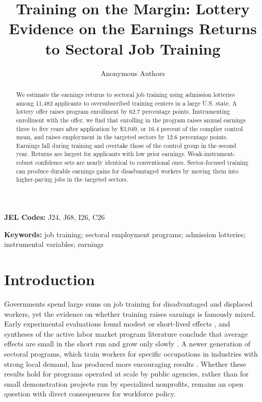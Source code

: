 \documentclass[12pt]{article}
\title{Training on the Margin: Lottery Evidence on the Earnings Returns to Sectoral Job Training}
\author{Anonymous Authors}
\date{}
\begin{document}
\maketitle

\begin{abstract}
We estimate the earnings returns to sectoral job training using admission lotteries among 11,482 applicants to oversubscribed training centers in a large U.S. state. A lottery offer raises program enrollment by 62.7 percentage points. Instrumenting enrollment with the offer, we find that enrolling in the program raises annual earnings three to five years after application by \$3,049, or 16.4 percent of the complier control mean, and raises employment in the targeted sectors by 12.6 percentage points. Earnings fall during training and overtake those of the control group in the second year. Returns are largest for applicants with low prior earnings. Weak-instrument-robust confidence sets are nearly identical to conventional ones. Sector-focused training can produce durable earnings gains for disadvantaged workers by moving them into higher-paying jobs in the targeted sectors.
\end{abstract}

\noindent\textbf{JEL Codes:} J24, J68, I26, C26

\noindent\textbf{Keywords:} job training; sectoral employment programs; admission lotteries; instrumental variables; earnings

\section{Introduction}

Governments spend large sums on job training for disadvantaged and displaced workers, yet the evidence on whether training raises earnings is famously mixed. Early experimental evaluations found modest or short-lived effects \citep{lalonde1986,schochet2008}, and syntheses of the active labor market program literature conclude that average effects are small in the short run and grow only slowly \citep{heckman1999,card2018}. A newer generation of sectoral programs, which train workers for specific occupations in industries with strong local demand, has produced more encouraging results \citep{katz2022}. Whether these results hold for programs operated at scale by public agencies, rather than for small demonstration projects run by specialized nonprofits, remains an open question with direct consequences for workforce policy.
\end{document}
